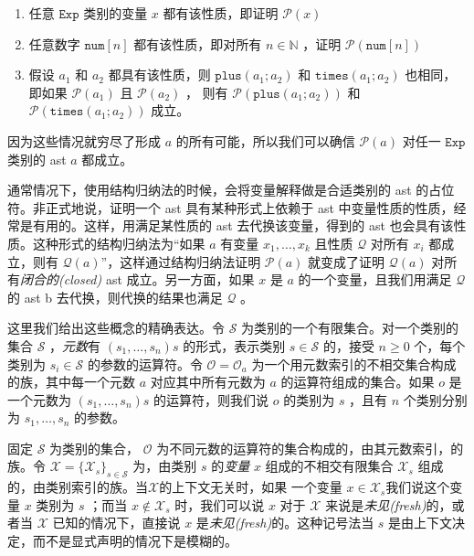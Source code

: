 \begin{enumerate}
\def\labelenumi{\arabic{enumi}.}
\item
  任意 \(\texttt{Exp}\) 类别的变量 \(x\) 都有该性质，即证明 \(\mathcal{P}(x)\)
\item
  任意数字 \(\texttt{num}[n]\) 都有该性质，即对所有 \(n \in \mathbb{N}\)
  ，证明 \(\mathcal{P}(\texttt{num}[n])\)
\item
  假设 \(a_1\) 和 \(a_2\) 都具有该性质，则 \(\texttt{plus}(a_1;a_2)\) 和
  \(\texttt{times}(a_1;a_2)\) 也相同，即如果 \(\mathcal{P}(a_1)\) 且
  \(\mathcal{P}(a_2)\) ， 则有 \(\mathcal{P}(\texttt{plus}(a_1;a_2))\)
  和 \(\mathcal{P}(\texttt{times}(a_1;a_2))\) 成立。
\end{enumerate}

因为这些情况就穷尽了形成 \(a\) 的所有可能，所以我们可以确信
\(\mathcal{P}(a)\) 对任一 \(\texttt{Exp}\) 类别的 ast \(a\) 都成立。

通常情况下，使用结构归纳法的时候，会将变量解释做是合适类别的 ast
的占位符。非正式地说，证明一个 ast
具有某种形式上依赖于 ast 中变量性质的性质，经常是有用的。这样，用满足某性质的 ast
去代换该变量，得到的 ast 也会具有该性质。这种形式的结构归纳法为``如果
\(a\) 有变量 \(x_1,\ldots,x_k\) 且性质 \(\mathcal{Q}\) 对所有 \(x_i\)
都成立，则有 \(\mathcal{Q}(a)\)''，这样通过结构归纳法证明
\(\mathcal{P}(a)\) 就变成了证明 \(\mathcal{Q}(a)\)
对所有\emph{闭合的(closed)} ast 成立。另一方面，如果 \(x\) 是 \(a\)
的一个变量，且我们用满足 \(\mathcal{Q}\) 的 ast b
去代换，则代换的结果也满足 \(\mathcal{Q}\) 。

这里我们给出这些概念的精确表达。令 \(\mathcal{S}\)
为类别的一个有限集合。对一个类别的集合 \(\mathcal{S}\) ，\emph{元数}有
\((s_1,\ldots ,s_n)s\) 的形式，表示类别 \(s\in \mathcal{S}\) 的，接受
\(n\ge 0\) 个，每个类别为 \(s_i \in \mathcal{S}\) 的参数的运算符。令
\(\mathcal{O} = {\mathcal {O}_a}\)
为一个用元数索引的不相交集合构成的族，其中每一个元数 \(a\)
对应其中所有元数为 \(a\) 的运算符组成的集合。如果 \(o\) 是一个元数为
\((s_1,\ldots,s_n)s\) 的运算符，则我们说 \(o\) 的类别为 \(s\) ，且有
\(n\) 个类别分别为 \(s_1,\ldots,s_n\) 的参数。

固定 \(\mathcal{S}\) 为类别的集合， \(\mathcal{O}\)
为不同元数的运算符的集合构成的，由其元数索引，的族。令
\(\mathcal{X} = \{\mathcal{X}_s\}_{s \in \mathcal{S}}\) 为，由类别 \(s\)
的\emph{变量} \(x\) 组成的不相交有限集合 \(\mathcal{X}_s\)
组成的，由类别索引的族。当\(\mathcal{X}\)的上下文无关时，如果 一个变量
\(x\in \mathcal{X}_s\)我们说这个变量 \(x\) 类别为 \(s\) ；而当
\(x \notin \mathcal{X}_s\) 时，我们可以说 \(x\) 对于 \(\mathcal{X}\)
来说是\emph{未见(fresh)}的，或者当 \(\mathcal{X}\) 已知的情况下，直接说
\(x\) 是\emph{未见(fresh)}的。这种记号法当 \(s\)
是由上下文决定，而不是显式声明的情况下是模糊的。

